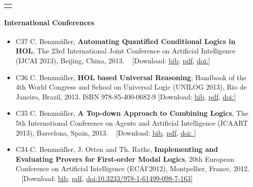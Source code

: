 \documentclass{article}
\newcommand{\tmstrong}[1]{\textbf{#1}}
\newenvironment{itemizedot}{\begin{itemize} \renewcommand{\labelitemi}{$\bullet$}\renewcommand{\labelitemii}{$\bullet$}\renewcommand{\labelitemiii}{$\bullet$}\renewcommand{\labelitemiv}{$\bullet$}}{\end{itemize}}
\begin{document}
{\noindent}\begin{tabular}{l}
  \hline
  \quad
\end{tabular}

\paragraph{International Conferences}

\begin{itemizedot}
  \item [C37] C.{\tmstrong{}} Benzm\"uller, {\tmstrong{Automating Quantified
  Conditional Logics in HOL}}{\tmstrong{}}, The 23rd International Joint
  Conference on Artificial Intelligence (IJCAI 2013), Beijing, China, 2013. \
  {\color{grey} [Download: {\small
  {\tmstrong{}}\href{../papers/C37.bib}{{\tmstrong{}}bib}}, {\small
  \href{../papers/C37.pdf}{pdf}}, {\small
  {\tmstrong{}}\href{http://dx.doi.org/}{doi:}}]}
  
  \item [C36] C.{\tmstrong{}} Benzm\"uller, {\tmstrong{HOL based Universal
  Reasoning}}{\tmstrong{}}, Handbook of the 4th World Congress and School on
  Universal Logic (UNILOG 2013), Rio de Janeiro, Brazil, 2013. ISBN
  978-85-400-0682-9 {\color{grey} [Download: {\small
  {\tmstrong{}}\href{../papers/C36{\tmstrong{}}.bib}{{\tmstrong{}}bib}},
  {\small \href{../papers/C36.pdf}{pdf}}, {\small
  {\tmstrong{}}\href{http://dx.doi.org/}{doi:}}]}
  
  \item [C35] C.{\tmstrong{}} Benzm\"uller, {\tmstrong{A Top-down Approach to
  Combining Logics}}{\tmstrong{}}, The 5th International Conference on Agents
  and Artificial Intelligence (ICAART 2013{\tmstrong{}}), Barcelona, Spain,
  2013. \ {\color{grey} [Download: {\small
  {\tmstrong{}}\href{../papers/C35.bib}{bib}}, {\small
  \href{../papers/C35.pdf}{pdf}}, {\small
  {\tmstrong{}}\href{http://dx.doi.org/}{doi: }}]}
  
  \item [C34] C.{\tmstrong{}} Benzm\"uller, J. Otten and Th. Raths,
  {\tmstrong{Implementing and Evaluating Provers for First-order Modal
  Logics}}{\tmstrong{}}, 20th European Conference on Artificial Intelligence
  (ECAI'2012), Montpellier, France, 2012. \ {\color{grey} [Download: {\small
  {\tmstrong{}}\href{../papers/C34.bib}{bib}}, {\small
  \href{../papers/C34.pdf}{pdf}}, {\small
  {\tmstrong{}}\href{http://dx.doi.org/10.3233/978-1-61499-098-7-163}{doi:10.3233/978-1-61499-098-7-163}}]}
  

\end{itemizedot}
\end{document}
